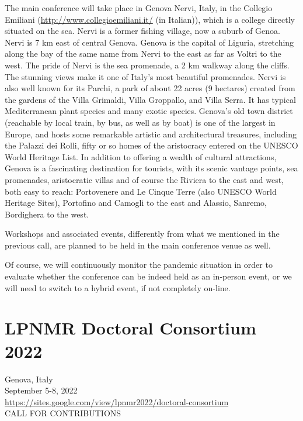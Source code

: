 \documentclass[prodmode,acmtecs]{acmsmall} %
\begin{document}
\begin{itemize}
  The main conference will take place in Genova Nervi, Italy, in the Collegio Emiliani (\href{http://www.collegioemiliani.it/}{http://www.collegioemiliani.it/} (in Italian)), which is a college directly situated on the sea. Nervi is a former fishing village, now a suburb of Genoa. Nervi is 7 km east of central Genova. Genova is the capital of Liguria, stretching along the bay of the same name from Nervi to the east as far as Voltri to the west. The pride of Nervi is the sea promenade, a 2 km walkway along the cliffs. The stunning views make it one of Italy's most beautiful promenades. Nervi is also well known for its Parchi, a park of about 22 acres (9 hectares) created from the gardens of the Villa Grimaldi, Villa Groppallo, and Villa Serra. It has typical Mediterranean plant species and many exotic species. Genova's old town district (reachable by local train, by bus, as well as by boat) is one of the largest in Europe, and hosts some remarkable artistic and architectural treasures, including the Palazzi dei Rolli, fifty or so homes of the aristocracy entered on the UNESCO World Heritage List. In addition to offering a wealth of cultural attractions, Genova is a fascinating destination for tourists, with its scenic vantage points, sea promenades, aristocratic villas and of course the Riviera to the east and west, both easy to reach: Portovenere and Le Cinque Terre (also UNESCO World Heritage Sites), Portofino and Camogli to the east and Alassio, Sanremo, Bordighera to the west. 
 
  Workshops and associated events, differently from what we mentioned in the previous call, are planned to be held in the main conference venue as well.  
 
  Of course, we will continuously monitor the pandemic situation in order to evaluate whether the conference can be indeed held as an in-person event, or we will need to switch to a hybrid event, if not completely on-line.  
 
\end{itemize}\section{LPNMR Doctoral Consortium 2022}\label{LPNMRDoctoralConsortium2022}  Genova, Italy\\ 
  September 5-8, 2022\\ 
  \href{https://sites.google.com/view/lpnmr2022/doctoral-consortium}{https://sites.google.com/view/lpnmr2022/doctoral-consortium}\\ 
CALL FOR CONTRIBUTIONS 
\end{document}
